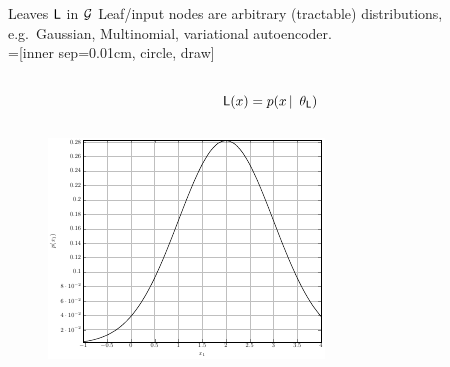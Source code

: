 \begin{frame}{Leaves $\mathsf{L}$ in $\mathcal{G}$}
    Leaf/input nodes are arbitrary (tractable) distributions, e.g.~Gaussian, Multinomial, variational autoencoder.\\[1em]

=[inner sep=0.01cm, circle, draw]
\begin{columns}
\begin{column}{.2\linewidth}
\end{column}
\begin{column}{.2\linewidth}
\end{column}
\begin{column}{.4\linewidth}
$\Leaf(x) = p(x \cbar \tp_\Leaf)$
\end{column}
\begin{column}{.2\linewidth}
\end{column}
\end{columns}

\centering
\begin{figure}
\includegraphics{leaf_distribution}
\end{figure}
\end{frame}

